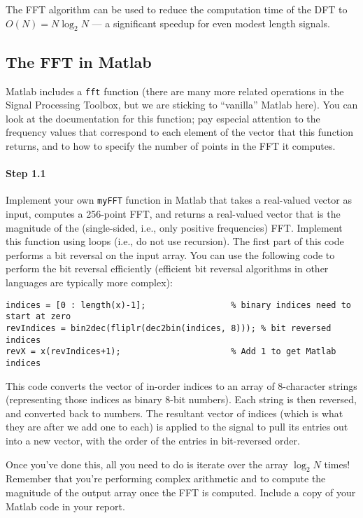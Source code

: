 The FFT algorithm can be used to reduce the computation time of the
DFT to $O(N)=N\log_2 N$ --- a significant speedup for even modest
length signals.

\subsection{The FFT in Matlab}

Matlab includes a \verb|fft| function (there are many more related
operations in the Signal Processing Toolbox, but we are sticking to
``vanilla'' Matlab here). You can look at the documentation for this
function; pay especial attention to the frequency values that
correspond to each element of the vector that this function returns,
and to how to specify the number of points in the FFT it computes.

\paragraph{Step 1.1} Implement your own \verb|myFFT| function in
Matlab that takes a real-valued vector as input, computes a 256-point
FFT, and returns a real-valued vector that is the magnitude of the
(single-sided, i.e., only positive frequencies) FFT. Implement this
function using loops (i.e., do not use recursion). The first part of
this code performs a bit reversal on the input array. You can use the
following code to perform the bit reversal efficiently (efficient bit
reversal algorithms in other languages are typically more complex):
\begin{lstlisting}[style=Matlab-editor,basicstyle=\mlttfamily\small]
% Assume that you want to do a bit reversal of the contents of the vector x
indices = [0 : length(x)-1];                 % binary indices need to start at zero
revIndices = bin2dec(fliplr(dec2bin(indices, 8))); % bit reversed indices
revX = x(revIndices+1);                      % Add 1 to get Matlab indices
\end{lstlisting}
This code converts the vector of in-order indices to an array of
8-character strings (representing those indices as binary 8-bit
numbers). Each string is then reversed, and converted back to
numbers. The resultant vector of indices (which is what they are after
we add one to each) is applied to the signal to pull its entries out
into a new vector, with the order of the entries in bit-reversed
order.

Once you've done this, all you need to do is iterate over the array
$\log_2 N$ times! Remember that you're performing complex arithmetic
and to compute the magnitude of the output array once the FFT is
computed. Include a copy of your Matlab code in your report.

